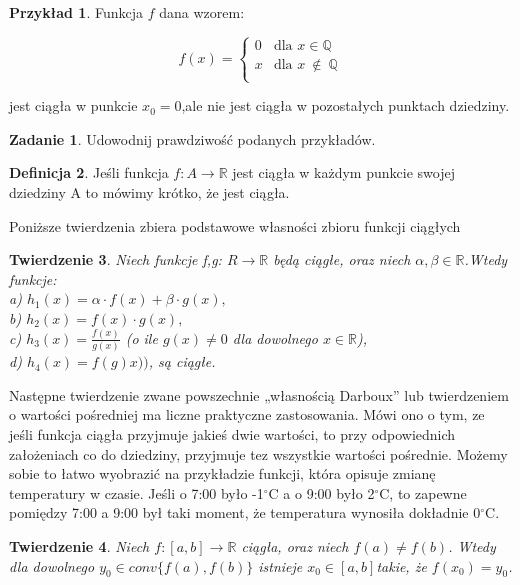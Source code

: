 \documentclass[12pt,a4paper]{article}
\newtheorem{tw}{Twierdzenie}[section]
\theoremstyle{definition}
\newtheorem{df}[tw]{Definicja}
\newtheorem{ex}[tw]{Przykład}
\newtheorem{zad}{Zadanie}
\begin{document}
\begin{ex}
Funkcja $f$ dana wzorem:
\begin{center}
\begin{displaymath}
f(x)= \left\{ \begin{array}{ll}
0 & \textrm{dla $x \in \mathbb{Q}$}\\
x & \textrm{dla $x\ \notin\ \mathbb{Q}$}\\
\end{array} \right.
\end{displaymath}
\end{center}
jest ciągła w punkcie $x_{0}=0$,ale nie jest ciągła w pozostałych punktach dziedziny.
\end{ex}
\begin{zad}
Udowodnij prawdziwość podanych przykładów.
\end{zad}
\begin{df}
Jeśli funkcja 
$f:A \to \mathbb{R}$ jest ciągła w każdym punkcie swojej dziedziny A to mówimy krótko, że jest ciągła.
\end{df}
\begin{center}
Poniższe twierdzenia zbiera podstawowe własności zbioru funkcji ciągłych
\end{center}
\begin{tw}
Niech funkcje f,g: $R \to\mathbb{R}$ będą ciągłe, oraz niech $\alpha ,\beta \in\mathbb{R}$.Wtedy funkcje:
\\a) $h_{1}(x)=\alpha \cdot f(x)+ \beta \cdot g(x),$
\\b) $h_{2}(x)=f(x) \cdot g(x),$
\\c) $h_{3}(x)=\frac{f(x)}{g(x)}$ (o ile $g(x) \neq 0$ dla dowolnego $x\in\mathbb{R}$),
\\d) $h_{4}(x)=f(g)x))$,
\newline są ciągłe.
\end{tw}
Następne twierdzenie zwane powszechnie „własnością Darboux” lub twierdzeniem
o wartości pośredniej ma liczne praktyczne zastosowania. Mówi ono o tym,
ze jeśli funkcja ciągła przyjmuje jakieś dwie wartości, to przy odpowiednich założeniach
co do dziedziny, przyjmuje tez wszystkie wartości pośrednie. Możemy sobie to
łatwo wyobrazić na przykładzie funkcji, która opisuje zmianę temperatury w czasie. Jeśli o 7:00 było -1$^{\circ}$C a o 9:00 było 2$^{\circ}$C, to zapewne pomiędzy 7:00 a 9:00 był taki moment, że temperatura wynosiła dokładnie 0$^{\circ}$C.
\begin{tw}
Niech $f:[a,b]\to\mathbb{R}$ ciągła, oraz niech $f(a)\neq f(b)$. Wtedy dla dowolnego $y_{0}\in conv\{f(a),f(b)\}$ istnieje $x_{0}\in[a,b]$takie, że $f(x_{0})=y_{0}$.
\end{tw}
\end{document}

